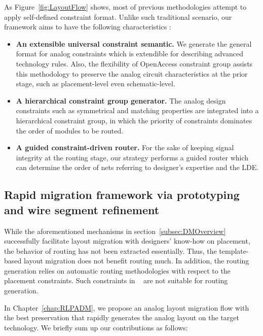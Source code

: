       As Figure~\ref{fig:LayoutFlow} shows, most of previous methodologies attempt to apply self-defined constraint format. Unlike such traditional scenario, our framework aims to have the following characteristics :
      \begin{itemize}
        \item {\bf An extensible universal constraint semantic.} We generate the general format for analog constraints which is extendible for describing advanced technology rules. Also, the flexibility of OpenAccess constraint group assists this methodology to preserve the analog circuit characteristics at the prior stage, such as placement-level even schematic-level.
        \item {\bf A hierarchical constraint group generator.} The analog design constraints such as symmetrical and matching properties are integrated into a hierarchical constraint group, in which the priority of constraints dominates the order of modules to be routed.
        \item {\bf A guided constraint-driven router.} For the sake of keeping signal integrity at the routing stage, our strategy performs a guided router which can determine the order of nets referring to designer's expertise and the LDE.
      \end{itemize}

    \subsection{Rapid migration framework via prototyping and wire segment refinement}
    \label{subsec:DMRContribute}

      While the aforementioned mechanisms in section~\ref{subsec:DMOverview} successfully facilitate layout migration with designers' know-how on placement, the behavior of routing has not been extracted essentially. Thus, the template-based layout migration does not benefit routing much. In addition, the routing generation relies on automatic routing methodologies with respect to the placement constraints. Such constraints in ~\cite{cbc-bhattacharya-dac04,Bhattacharya_ASPDAC04,msc-bhattacharya-tcad06,Zhang_TCAD08,Wang_ALRGP_TODAES2011} are not suitable for routing generation. 

      In Chapter~\ref{chap:RLPADM}, we propose an analog layout migration flow with the best preservation that rapidly generates the analog layout on the target technology. We briefly sum up our contributions as follows:

